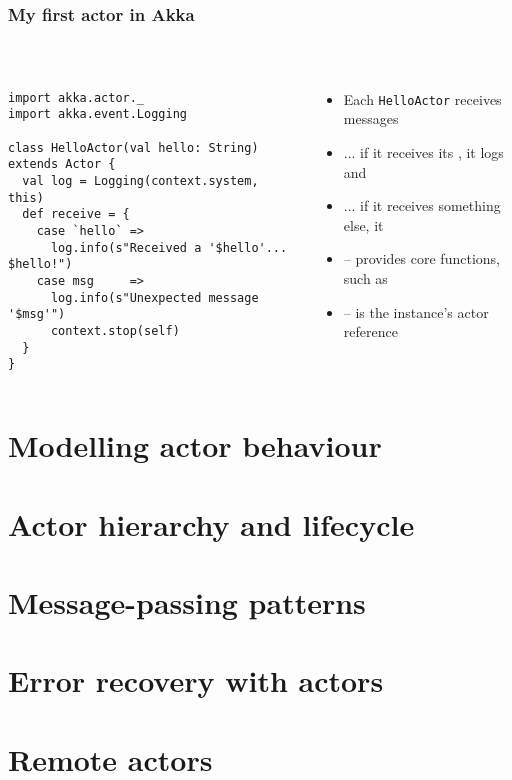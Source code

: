 \documentclass[aspectratio=169]{beamer}
\begin{document}
\begin{frame}[fragile]\frametitle{My first actor in Akka}
~\\[-8mm]
\begin{columns}
\begin{column}{0.56\textwidth}
\begin{lstlisting}[emph={Actor, Logging, receive, system,stop}]
import akka.actor._
import akka.event.Logging

class HelloActor(val hello: String) extends Actor {
  val log = Logging(context.system, this)
  def receive = {
    case `hello` =>
      log.info(s"Received a '$hello'... $hello!")
    case msg     =>
      log.info(s"Unexpected message '$msg'")
      context.stop(self)
  }
}
\end{lstlisting}
\end{column}
\begin{column}{0.44\textwidth}
\begin{itemize}
  \item Each \texttt{HelloActor} receives messages
  \item ... if it receives its , it logs and 
  \item ... if it receives something else, it 
  \item {} -- provides core functions, such as 
  \item {} -- is the instance's actor reference
\end{itemize}
\end{column}
\end{columns}
\end{frame}


\section{Modelling actor behaviour}


\section{Actor hierarchy and lifecycle}


\section{Message-passing patterns}


\section{Error recovery with actors}


\section{Remote actors}
\end{document}
